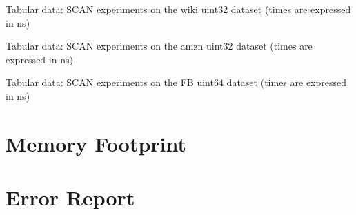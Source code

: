 \documentclass{article}
\begin{document}
\begin{table}[t]

\caption{Tabular data: SCAN experiments on the wiki uint32 dataset (times are expressed in ns)}
\end{table}

\begin{table}[t]

\caption{Tabular data: SCAN experiments on the amzn uint32 dataset (times are expressed in ns)}
\end{table}

\begin{table}[t]

\caption{Tabular data: SCAN experiments on the FB uint64 dataset (times are expressed in ns)}
\end{table}

\clearpage

\section*{Memory Footprint}


\section*{Error Report}

\end{document}
